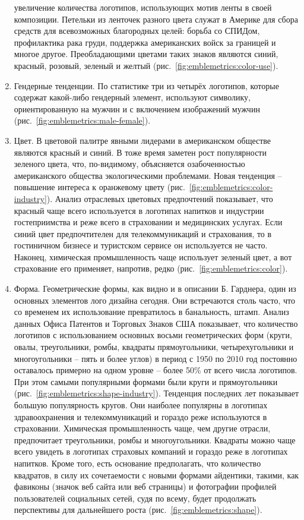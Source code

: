 \begin{enumerate}
  увеличение количества логотипов, использующих мотив ленты в своей композиции. Петельки из ленточек
  разного цвета служат в Америке для сбора средств для всевозможных благородных целей: борьба со
  СПИДом, профилактика рака груди, поддержка американских войск за границей и многое
  другое. Преобладающими цветами таких знаков являются синий, красный, розовый, зеленый и желтый
  (рис.~\ref{fig:emblemetrics:color-use}).
\item Гендерные тенденции. По статистике три из четырёх логотипов, которые содержат какой-либо
  гендерный элемент, используют символику, ориентированную на мужчин и с включением изображений
  мужчин (рис.~\ref{fig:emblemetrics:male-female}).
\item Цвет. В цветовой палитре явными лидерами в американском обществе являются красный и синий. В
  тоже время заметен рост популярности зеленого цвета, что, по-видимому, объясняется  озабоченностью
  американского общества экологическими проблемами. Новая тенденция -- повышение интереса к
  оранжевому цвету (рис.~\ref{fig:emblemetrics:color-industry}). Анализ отраслевых цветовых
  предпочтений показывает, что красный чаще всего используется в логотипах напитков и индустрии
  гостеприимства и реже всего в страховании и медицинских услугах. Если  синий цвет предпочтителен
  для  телекоммуникаций и страхования, то в гостиничном бизнесе и туристском сервисе он используется
  не часто. Наконец, химическая промышленность чаще использует зеленый цвет, а вот страхование его
  применяет, напротив, редко (рис.~\ref{fig:emblemetrics:color}).
\item Форма. Геометрические формы, как видно и в описании Б. Гарднера, один из основных элементов
  лого дизайна сегодня. Они встречаются столь часто, что со временем их использование превратилось в
  банальность, штамп. Анализ данных Офиса Патентов и Торговых Знаков США показывает, что  количество
  логотипов с использованием основных восьми геометрических форм (круги, овалы, треугольники, ромбы,
  квадраты прямоугольники, четырехугольники и многоугольники -- пять и более  углов)  в период с
  1950 по 2010 год постоянно оставалось примерно на одном уровне -- более 50\% от всего числа
  логотипов. При этом самыми популярными формами были круги и прямоугольники
  (рис.~\ref{fig:emblemetrics:shape-industry}). Тенденция последних лет показывает большую
  популярность кругов. Они наиболее популярны в логотипах здравоохранения и телекоммуникаций и
  гораздо реже используются в страховании. Химическая промышленность чаще, чем другие отрасли,
  предпочитает треугольники, ромбы и многоугольники. Квадраты можно чаще всего увидеть в логотипах
  страховых компаний и гораздо реже в логотипах напитков. Кроме того, есть основание предполагать,
  что количество квадратов, в силу их сочетаемости  с новыми формами айдентики, такими, как фавиконы
  (значок веб сайта или веб страницы) и фотографии профилей пользователей социальных сетей, судя по
  всему, будет продолжать  перспективы  для дальнейшего роста (рис.~\ref{fig:emblemetrics:shape}).
\end{enumerate}

